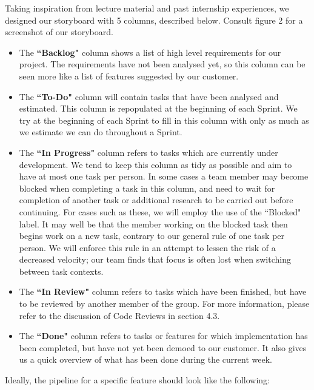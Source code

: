 \documentclass[10pt]{article}
\begin{document}
Taking inspiration from lecture material and past internship experiences, we designed our storyboard with 5 columns, described below. Consult figure 2 for a screenshot of our storyboard.
\begin{itemize}
\item The \textbf{``Backlog"} column shows a list of high level requirements for our project. The requirements have not been analysed yet, so this column can be seen more like a list of features suggested by our customer.
\item The \textbf{``To-Do"} column will contain tasks that have been analysed and estimated. This column is repopulated at the beginning of each Sprint. We try at the beginning of each Sprint to fill in this column with only as much as we estimate we can do throughout a Sprint.
\item The \textbf{``In Progress"} column refers to tasks which are currently under development. We tend to keep this column as tidy as possible and aim to have at most one task per person. In some cases a team member may become blocked when completing a task in this column, and need to wait for completion of another task or additional research to be carried out before continuing. For cases such as these, we will employ the use of the ``Blocked" label. It may well be that the member working on the blocked task then begins work on a new task, contrary to our general rule of one task per person. We will enforce this rule in an attempt to lessen the risk of a decreased velocity; our team finds that focus is often lost when switching between task contexts.
\item The \textbf{``In Review"} column refers to tasks which have been finished, but have to be reviewed by another member of the group. For more information, please refer to the discussion of Code Reviews in section 4.3.
\item The \textbf{``Done"} column refers to tasks or features for which implementation has been completed, but have not yet been demoed to our customer. It also gives us a quick overview of what has been done during the current week.
\end{itemize}
Ideally, the pipeline for a specific feature should look like the following:
\end{document}
